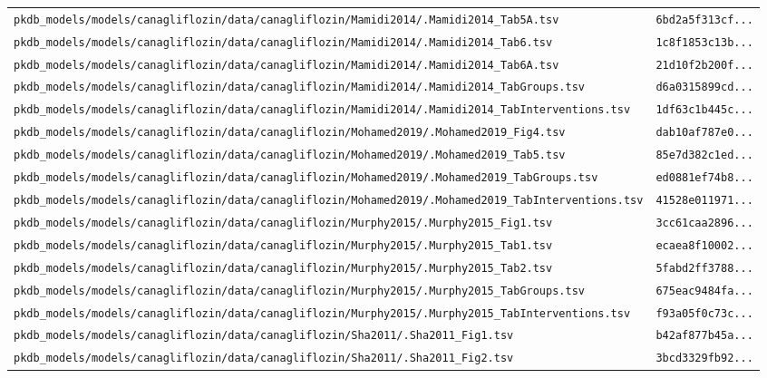 \documentclass{article}
\begin{document}
\begin{longtable}{ll}
\texttt{pkdb\_models/models/canagliflozin/data/canagliflozin/Mamidi2014/.Mamidi2014\_Tab5A.tsv} & \texttt{6bd2a5f313cf...} \\
\texttt{pkdb\_models/models/canagliflozin/data/canagliflozin/Mamidi2014/.Mamidi2014\_Tab6.tsv} & \texttt{1c8f1853c13b...} \\
\texttt{pkdb\_models/models/canagliflozin/data/canagliflozin/Mamidi2014/.Mamidi2014\_Tab6A.tsv} & \texttt{21d10f2b200f...} \\
\texttt{pkdb\_models/models/canagliflozin/data/canagliflozin/Mamidi2014/.Mamidi2014\_TabGroups.tsv} & \texttt{d6a0315899cd...} \\
\texttt{pkdb\_models/models/canagliflozin/data/canagliflozin/Mamidi2014/.Mamidi2014\_TabInterventions.tsv} & \texttt{1df63c1b445c...} \\
\texttt{pkdb\_models/models/canagliflozin/data/canagliflozin/Mohamed2019/.Mohamed2019\_Fig4.tsv} & \texttt{dab10af787e0...} \\
\texttt{pkdb\_models/models/canagliflozin/data/canagliflozin/Mohamed2019/.Mohamed2019\_Tab5.tsv} & \texttt{85e7d382c1ed...} \\
\texttt{pkdb\_models/models/canagliflozin/data/canagliflozin/Mohamed2019/.Mohamed2019\_TabGroups.tsv} & \texttt{ed0881ef74b8...} \\
\texttt{pkdb\_models/models/canagliflozin/data/canagliflozin/Mohamed2019/.Mohamed2019\_TabInterventions.tsv} & \texttt{41528e011971...} \\
\texttt{pkdb\_models/models/canagliflozin/data/canagliflozin/Murphy2015/.Murphy2015\_Fig1.tsv} & \texttt{3cc61caa2896...} \\
\texttt{pkdb\_models/models/canagliflozin/data/canagliflozin/Murphy2015/.Murphy2015\_Tab1.tsv} & \texttt{ecaea8f10002...} \\
\texttt{pkdb\_models/models/canagliflozin/data/canagliflozin/Murphy2015/.Murphy2015\_Tab2.tsv} & \texttt{5fabd2ff3788...} \\
\texttt{pkdb\_models/models/canagliflozin/data/canagliflozin/Murphy2015/.Murphy2015\_TabGroups.tsv} & \texttt{675eac9484fa...} \\
\texttt{pkdb\_models/models/canagliflozin/data/canagliflozin/Murphy2015/.Murphy2015\_TabInterventions.tsv} & \texttt{f93a05f0c73c...} \\
\texttt{pkdb\_models/models/canagliflozin/data/canagliflozin/Sha2011/.Sha2011\_Fig1.tsv} & \texttt{b42af877b45a...} \\
\texttt{pkdb\_models/models/canagliflozin/data/canagliflozin/Sha2011/.Sha2011\_Fig2.tsv} & \texttt{3bcd3329fb92...} \\

\end{longtable}
\end{document}
